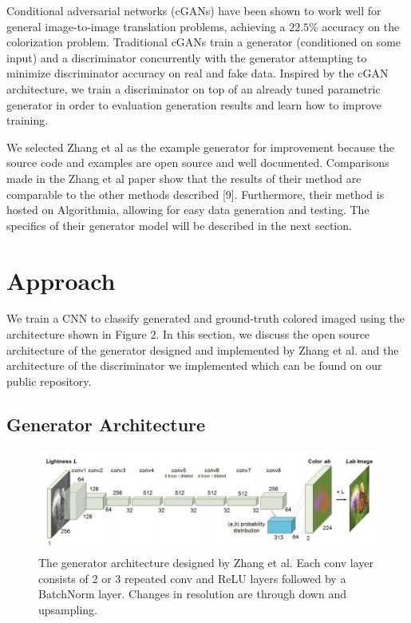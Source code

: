 \documentclass[10pt,twocolumn,letterpaper]{article}
\begin{document}
Conditional adversarial networks (cGANs) have been shown to work well for general image-to-image translation problems, achieving a $22.5\%$ accuracy on the colorization problem. Traditional cGANs train a generator (conditioned on some input) and a discriminator concurrently with the generator attempting to minimize discriminator accuracy on real and fake data. Inspired by the cGAN architecture, we train a discriminator on top of an already tuned parametric generator in order to evaluation generation results and learn how to improve training. 

We selected Zhang et al as the example generator for improvement because the source code and examples are open source and well documented. Comparisons made in the Zhang et al paper show that the results of their method are comparable to the other methods described [9]. Furthermore, their method is hosted on Algorithmia, allowing for easy data generation and testing. The specifics of their generator model will be described in the next section.

\section{Approach}

We train a CNN to classify generated and ground-truth colored imaged using the architecture shown in Figure 2. In this section, we discuss the open source architecture of the generator designed and implemented by Zhang et al. and the architecture of the discriminator we implemented which can be found on our public repository.

\subsection{Generator Architecture}

\begin{figure}[htp]

\centering
\includegraphics[width= \textwidth]{gen_arch.png} 
\caption{The generator architecture designed by Zhang et al. Each conv layer consists of 2 or 3 repeated conv and ReLU layers followed by a BatchNorm layer. Changes in resolution are through down and upsampling.}

\end{figure}
\end{document}

